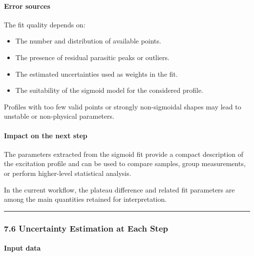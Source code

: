 \hypertarget{error-sources-4}{%
\paragraph{Error sources}\label{error-sources-4}}

The fit quality depends on:

\begin{itemize}
\tightlist
\item
  The number and distribution of available points.
\item
  The presence of residual parasitic peaks or outliers.
\item
  The estimated uncertainties used as weights in the fit.
\item
  The suitability of the sigmoid model for the considered profile.
\end{itemize}

Profiles with too few valid points or strongly non-sigmoidal shapes may
lead to unstable or non-physical parameters.

\hypertarget{impact-on-the-next-step-4}{%
\paragraph{Impact on the next step}\label{impact-on-the-next-step-4}}

The parameters extracted from the sigmoid fit provide a compact
description of the excitation profile and can be used to compare
samples, group measurements, or perform higher-level statistical
analysis.

In the current workflow, the plateau difference and related fit
parameters are among the main quantities retained for interpretation.

\begin{center}\rule{0.5\linewidth}{0.5pt}\end{center}

\hypertarget{uncertainty-estimation-at-each-step}{%
\subsubsection{7.6 Uncertainty Estimation at Each
Step}\label{uncertainty-estimation-at-each-step}}

\hypertarget{input-data-5}{%
\paragraph{Input data}\label{input-data-5}}

